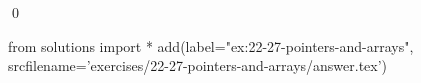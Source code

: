 
\begin{ex}
  \label{ex:22-27-pointers-and-arrays}
  
  \qed
\end{ex}
\begin{python0}
from solutions import *
add(label="ex:22-27-pointers-and-arrays",
    srcfilename='exercises/22-27-pointers-and-arrays/answer.tex')
\end{python0}
